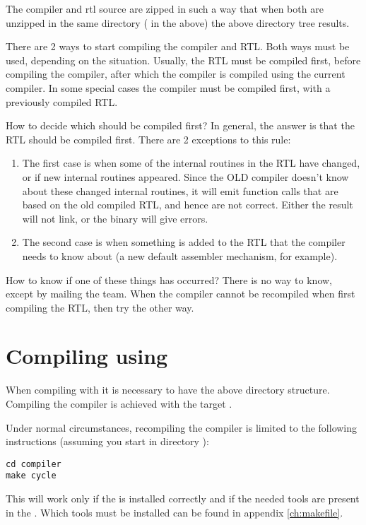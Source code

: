 {The compiler and rtl source are zipped in such a way that when both are
unzipped in the same directory ( in the above) the above
directory tree results.

There are 2 ways to start compiling the compiler and RTL. Both ways must be
used, depending on the situation. Usually, the RTL must be compiled first,
before compiling the compiler, after which the compiler is compiled using
the current compiler. In some special cases the compiler must be compiled
first, with a previously compiled RTL.

How to decide which should be compiled first? In general, the answer is that
the RTL should be compiled first. There are 2 exceptions to this rule:
\begin{enumerate}
\item The first case is when some of the internal routines in the RTL
have changed, or if new internal routines appeared. Since the OLD compiler
doesn't know about these changed internal routines, it will emit function
calls that are based on the old compiled RTL, and hence are not correct.
Either the result will not link, or the binary will give errors.
\item The second case is when something is added to the RTL that the
compiler needs to know about (a new default assembler mechanism, for
example).
\end{enumerate}
How to know if one of these things has occurred? There is no way to know,
except by mailing the \fpc team. When the compiler cannot be recompiled
when first compiling the RTL, then try the other way.

\section{Compiling using }

When compiling with  it is necessary to have the above directory
structure. Compiling the compiler is achieved with the target .

Under normal circumstances, recompiling the compiler is limited to the
following instructions (assuming you start in directory ):
\begin{verbatim}
cd compiler
make cycle
\end{verbatim}
This will work only if the  is installed correctly and
if the needed tools are present in the . Which tools must be
installed can be found in appendix \ref{ch:makefile}.

}
